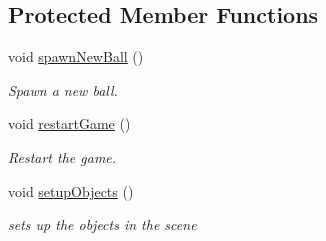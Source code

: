 \subsection*{Protected Member Functions}
\begin{DoxyCompactItemize}
\item 
\hypertarget{class_pinball_scene_ac42acaaab8d70b460aa8ed721951f951}{void \hyperlink{class_pinball_scene_ac42acaaab8d70b460aa8ed721951f951}{spawn\+New\+Ball} ()}\label{class_pinball_scene_ac42acaaab8d70b460aa8ed721951f951}

\begin{DoxyCompactList}\small\item\em Spawn a new ball. \end{DoxyCompactList}\item 
\hypertarget{class_pinball_scene_ace817bd823f2382a604d26f3447df3a2}{void \hyperlink{class_pinball_scene_ace817bd823f2382a604d26f3447df3a2}{restart\+Game} ()}\label{class_pinball_scene_ace817bd823f2382a604d26f3447df3a2}

\begin{DoxyCompactList}\small\item\em Restart the game. \end{DoxyCompactList}\item 
\hypertarget{class_pinball_scene_a8d760114d715152b057be9ea678e95bf}{void \hyperlink{class_pinball_scene_a8d760114d715152b057be9ea678e95bf}{setup\+Objects} ()}\label{class_pinball_scene_a8d760114d715152b057be9ea678e95bf}

\begin{DoxyCompactList}\small\item\em sets up the objects in the scene \end{DoxyCompactList}\end{DoxyCompactItemize}
